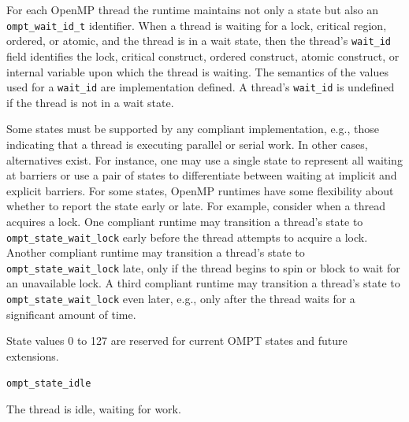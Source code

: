 \documentclass{article}
\newcommand{\descheader}[1]{{\needspace{3\baselineskip}\vspace{1em}\noindent \fbox{#1}}}
\begin{document}
For each OpenMP thread the runtime maintains not only a state but also an \verb|ompt_wait_id_t|
identifier.  When a thread is waiting for a lock, critical region,
ordered, or atomic, and the thread is in a wait
state, then 
the thread's \verb|wait_id| field identifies the lock, critical construct, ordered construct, atomic construct, or internal variable
upon which the
thread is waiting. The semantics of the values used for a \verb|wait_id| are implementation defined.
A thread's \verb|wait_id| is undefined if the thread
is not in a wait state.

Some states must be supported by any compliant implementation, e.g., those indicating that a thread is executing parallel or serial work. In other cases, alternatives exist. For instance, one may use a single state to represent all waiting at barriers or use a pair of states to differentiate between waiting at implicit and explicit barriers.
For some states, OpenMP runtimes have some flexibility about whether to report the state early or late.
For example, consider when a thread acquires a lock. One
compliant runtime may transition a thread's state to 
\verb|ompt_state_wait_lock|  early before the thread attempts to acquire a
lock. Another compliant runtime may transition a thread's state to
\verb|ompt_state_wait_lock| late, only if the thread begins to spin or
block to wait for an unavailable lock. A third compliant runtime
may transition a thread's state to \verb|ompt_state_wait_lock| even later, e.g., only
after the thread waits for a significant amount of time. 

State values 0 to 127 are reserved for current OMPT states and future extensions.  

\descheader{Idle State}

\begin{description}
\item \verb|ompt_state_idle| 

  The thread is idle, waiting for work.
\end{description}

\descheader{Work States}
\end{document}
